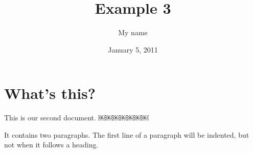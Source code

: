 \documentclass[a4paper,11pt]{article}
\begin{document}
 
\title{Example 3} 
\author{My name} 
\date{January 5, 2011} 
\maketitle 
\section{What's this?} This   is	 our 
second document. ￼￼￼￼￼￼￼

It contains two paragraphs. The first line of a paragraph will be indented, but not when it follows a heading.

\end{document}
